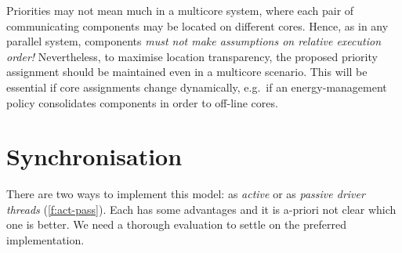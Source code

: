 \documentclass[a4paper,12pt]{report}
\begin{document}
Priorities may not mean much in a multicore system, where each
pair of communicating components may be located on different
cores. Hence, as in any parallel system, components \emph{must not
  make assumptions on relative execution order!} Nevertheless, to
maximise location transparency, the proposed priority assignment
should be maintained even in a multicore scenario. This will be
essential if core assignments change dynamically, e.g.\ if an
energy-management policy consolidates components in order to off-line
cores.

\section{Synchronisation}\label{s:sync}


There are two ways to implement this model: as \emph{active} or as
\emph{passive driver threads} (\autoref{f:act-pass}).  Each has some advantages and it is a-priori
not clear which one is better. We need a thorough evaluation to settle
on the preferred implementation.
\end{document}
